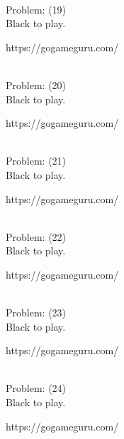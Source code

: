 \documentclass[11pt]{article}
\begin{document}
\begin{minipage}[t]{0.5\textwidth}
  {\centering
  
\\
  Problem: (19)\\
  Black to play.

https://gogameguru.com/\\
  }
\end{minipage}
\begin{minipage}[t]{0.5\textwidth}
  {\centering
  
\\
  Problem: (20)\\
  Black to play.

https://gogameguru.com/\\
  }
\end{minipage}
\begin{minipage}[t]{0.5\textwidth}
  {\centering
  
\\
  Problem: (21)\\
  Black to play.

https://gogameguru.com/\\
  }
\end{minipage}
\begin{minipage}[t]{0.5\textwidth}
  {\centering
  
\\
  Problem: (22)\\
  Black to play.

https://gogameguru.com/\\
  }
\end{minipage}
\begin{minipage}[t]{0.5\textwidth}
  {\centering
  
\\
  Problem: (23)\\
  Black to play.

https://gogameguru.com/\\
  }
\end{minipage}
\begin{minipage}[t]{0.5\textwidth}
  {\centering
  
\\
  Problem: (24)\\
  Black to play.

https://gogameguru.com/\\
  }
\end{minipage}
\end{document}
